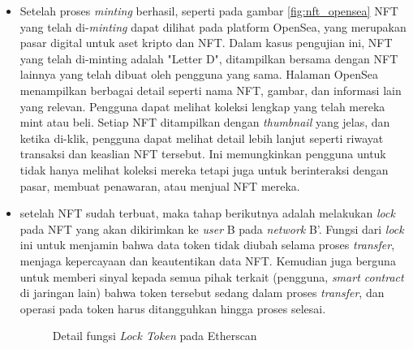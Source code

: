 \begin{itemize}
    \item Setelah proses \emph{minting} berhasil, seperti pada gambar \ref*{fig:nft_opensea} NFT yang telah di-\emph{minting} dapat dilihat pada platform OpenSea, yang merupakan pasar digital untuk aset kripto dan NFT. Dalam kasus pengujian ini, NFT yang telah di-minting adalah "Letter D", ditampilkan bersama dengan NFT lainnya yang telah dibuat oleh pengguna yang sama. Halaman OpenSea menampilkan berbagai detail seperti nama NFT, gambar, dan informasi lain yang relevan. Pengguna dapat melihat koleksi lengkap yang telah mereka mint atau beli. Setiap NFT ditampilkan dengan \emph{thumbnail} yang jelas, dan ketika di-klik, pengguna dapat melihat detail lebih lanjut seperti riwayat transaksi dan keaslian NFT tersebut. Ini memungkinkan pengguna untuk tidak hanya melihat koleksi mereka tetapi juga untuk berinteraksi dengan pasar, membuat penawaran, atau menjual NFT mereka.


    \item setelah NFT sudah terbuat, maka tahap berikutnya adalah melakukan \emph{lock} pada NFT yang akan dikirimkan ke \emph{user} B pada \emph{network} B'. Fungsi dari \emph{lock} ini untuk menjamin bahwa data token tidak diubah selama proses \emph{transfer}, menjaga kepercayaan dan keautentikan data NFT. Kemudian juga berguna untuk memberi sinyal kepada semua pihak terkait (pengguna, \emph{smart contract} di jaringan lain) bahwa token tersebut sedang dalam proses \emph{transfer}, dan operasi pada token harus ditangguhkan hingga proses selesai.

    \begin{figure} [H] \centering
    \caption{Detail fungsi \emph{Lock Token} pada Etherscan}
    \label{fig:locktoken}
    \end{figure}


\end{itemize}
